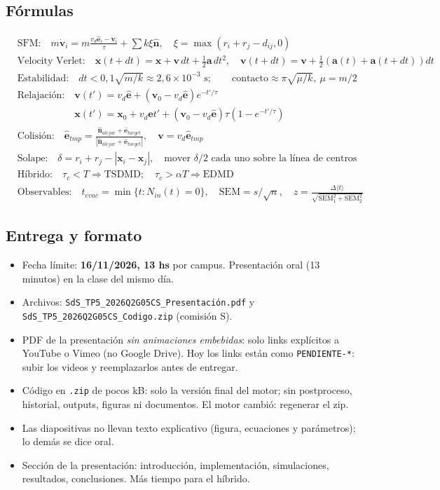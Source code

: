 \documentclass[10.5pt,a4paper]{article}
\newcommand{\vect}[1]{\mathbf{#1}}
\begin{document}
\subsection{Fórmulas}
\begin{align*}
&\text{SFM:}\quad m\dot{\vect v}_i=m\tfrac{v_d\hat{\vect e}_i-\vect v_i}{\tau}+\textstyle\sum k\xi\hat{\vect n},\quad\xi=\max(r_i+r_j-d_{ij},0)\\
&\text{Velocity Verlet:}\quad \vect x(t{+}dt)=\vect x+\vect v\,dt+\tfrac12\vect a\,dt^2,\quad \vect v(t{+}dt)=\vect v+\tfrac12(\vect a(t)+\vect a(t{+}dt))dt\\
&\text{Estabilidad:}\quad dt<0{,}1\sqrt{m/k}\approx2{,}6\times10^{-3}\text{ s};\qquad \text{contacto}\approx\pi\sqrt{\mu/k},\ \mu=m/2\\
&\text{Relajación:}\quad \vect v(t')=v_d\hat{\vect e}+(\vect v_0-v_d\hat{\vect e})e^{-t'/\tau}\\
&\phantom{\text{Relajación:}}\quad \vect x(t')=\vect x_0+v_d\hat{\vect e}t'+(\vect v_0-v_d\hat{\vect e})\tau(1-e^{-t'/\tau})\\
&\text{Colisión:}\quad \hat{\vect e}_{tmp}=\tfrac{\hat{\vect n}_{alejar}+\hat{\vect e}_{target}}{|\hat{\vect n}_{alejar}+\hat{\vect e}_{target}|},\quad\vect v=v_d\hat{\vect e}_{tmp}\\
&\text{Solape:}\quad\delta=r_i+r_j-|\vect x_i-\vect x_j|,\quad\text{mover }\delta/2\text{ cada uno sobre la línea de centros}\\
&\text{Híbrido:}\quad \tau_c<T\Rightarrow\text{TSDMD};\quad\tau_c>\alpha T\Rightarrow\text{EDMD}\\
&\text{Observables:}\quad t_{evac}=\min\{t:N_{in}(t)=0\},\quad\mathrm{SEM}=s/\sqrt n,\quad z=\tfrac{\Delta\langle t\rangle}{\sqrt{\mathrm{SEM}_1^2+\mathrm{SEM}_2^2}}
\end{align*}

\subsection{Entrega y formato}
\begin{itemize}
\item Fecha límite: \textbf{16/11/2026, 13 hs} por campus. Presentación oral (13 minutos) en la clase del mismo día.
\item Archivos: \texttt{SdS\_TP5\_2026Q2G05CS\_Presentación.pdf} y \texttt{SdS\_TP5\_2026Q2G05CS\_Codigo.zip} (comisión S).
\item PDF de la presentación \emph{sin animaciones embebidas}: solo links explícitos a YouTube o Vimeo (no Google Drive). Hoy los links están como \texttt{PENDIENTE-*}: subir los videos y reemplazarlos antes de entregar.
\item Código en \texttt{.zip} de pocos kB: solo la versión final del motor; sin postproceso, historial, outputs, figuras ni documentos. El motor cambió: regenerar el zip.
\item Las diapositivas no llevan texto explicativo (figura, ecuaciones y parámetros); lo demás se dice oral.
\item Sección de la presentación: introducción, implementación, simulaciones, resultados, conclusiones. Más tiempo para el híbrido.
\end{itemize}
\end{document}
